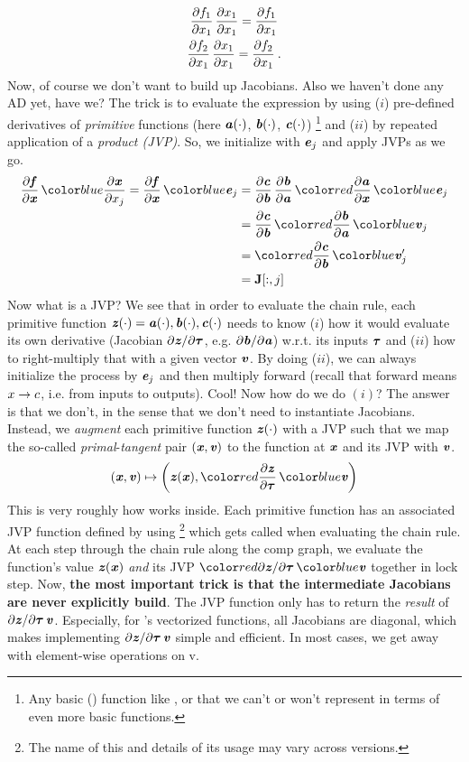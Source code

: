 \documentclass[paper=a4,11pt,headsepline]{scrartcl}
\begin{document}
\begin{gather*}
    \dfrac{\partial f_1}{\partial x_1}\,\dfrac{\partial x_1}{\partial x_1} = \dfrac{\partial f_1}{\partial x_1} \\
    \dfrac{\partial f_2}{\partial x_1}\,\dfrac{\partial x_1}{\partial x_1} = \dfrac{\partial f_2}{\partial x_1}
    \:.
\end{gather*}
Now, of course we don't want to build up Jacobians. Also we haven't done any AD
yet, have we? The trick is to evaluate the expression by using ($i$)
pre-defined derivatives of \emph{primitive} functions (here $\bm{\mathit{a}}(\cdot)$,
$\bm{\mathit{b}}(\cdot)$, $\bm{\mathit{c}}(\cdot)$)%
\footnote{Any basic (\numpy) function like , 
or  that we can't or won't represent in terms of even more basic
functions.}
and ($ii$) by repeated application of a
\emph{  product (JVP)}. So, we initialize with $\bm{\mathit{e}}_j$
and apply JVPs as we go.
\begin{align*}
    \pd{\ve f}{\ve x}\,\blue{\pd{\ve x}{x_j}} = \pd{\ve f}{\ve x}\,\blue{\ve e_j}
            &= \pd{\ve c}{\ve b}\,\pd{\ve b}{\ve a}\,\red{\pd{\ve a}{\ve x}}\,\blue{\ve e_j} \\
            &= \pd{\ve c}{\ve b}\,\red{\pd{\ve b}{\ve a}}\,\blue{\ve v_j} \\
            &= \red{\pd{\ve c}{\ve b}}\,\blue{\ve v_j'} \\
            &= \ma J[:,j]
\end{align*}
%
Now what is a JVP? We see that in order to evaluate the chain rule, each
primitive function $\bm{\mathit{z}}(\cdot) = \bm{\mathit{a}}(\cdot), \bm{\mathit{b}}(\cdot), \bm{\mathit{c}}(\cdot)$
needs to know ($i$) how it would evaluate its own derivative (Jacobian
$\partial \bm{\mathit{z}}/\partial \bm{\mathit{\tau}}$, e.g. $\partial \bm{\mathit{b}}/\partial \bm{\mathit{a}}$) w.r.t. its inputs $\bm{\mathit{\tau}}$ and ($ii$)
how to right-multiply that with a given vector $\bm{\mathit{v}}$. By doing ($ii$), we can
always initialize the process by $\bm{\mathit{e}}_j$ and then multiply forward (recall
that forward means $x\rightarrow c$, i.e. from inputs to outputs). Cool! Now how do we
do $(i)$? The answer is that we don't, in the sense that we don't need to
instantiate Jacobians. Instead, we \emph{augment} each primitive function $\bm{\mathit{z}}(\cdot)$ with a JVP such that we map the so-called
\emph{primal}-\emph{tangent} pair $(\bm{\mathit{x}}, \bm{\mathit{v}})$ to the function at $\bm{\mathit{x}}$
and its JVP with $\bm{\mathit{v}}$.
%
\begin{equation*}
    (\ve x, \ve v) \mapsto \left(\ve z(\ve x), \red{\pd{\ve z}{\ve\tau}}\,\blue{\ve v}\right)
\end{equation*}
%
This is very roughly how \jax works inside. Each primitive function has an
associated JVP function defined by using %
\footnote{The name of this and details of its usage may vary across \jax
versions.} %
which gets called when evaluating the chain rule. At each step through the
chain rule along the comp graph, we evaluate the function's value $\bm{\mathit{z}}(\bm{\mathit{x}})$ \emph{and} its JVP $\red{\pdi{\ve z}{\ve{\tau}}}\,\blue{\ve v}$ together in lock step.
Now, \textbf{the most important trick is that the intermediate Jacobians are
never explicitly build}. The JVP function only has to return the \emph{result}
of $\partial \bm{\mathit{z}}/\partial \bm{\mathit{\tau}}\,\bm{\mathit{v}}$. Especially, for \numpy's vectorized
functions, all Jacobians are diagonal, which makes implementing $\partial \bm{\mathit{z}}/\partial \bm{\mathit{\tau}}\,\bm{\mathit{v}}$ simple and efficient. In most cases, we get away with
element-wise operations on \ve v.
\end{document}
